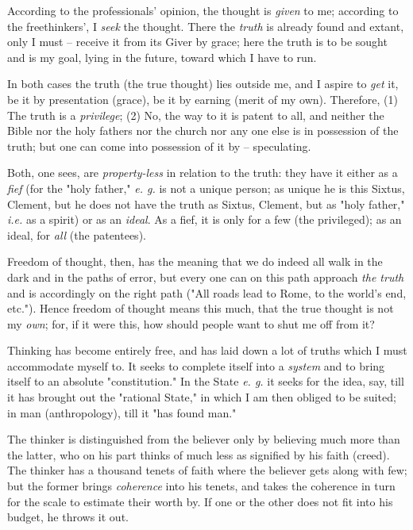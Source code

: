 \documentclass[a4paper]{book}
\begin{document}
According to the professionals' opinion, the thought is \textit{given} to me; 
according to the freethinkers', I \textit{seek} the thought. There the 
\textit{truth} is already found and extant, only I must -- receive it from its 
Giver by grace; here the truth is to be sought and is my goal, lying in the 
future, toward which I have to run.

In both cases the truth (the true thought) lies outside me, and I aspire to 
\textit{get} it, be it by presentation (grace), be it by earning (merit of my 
own). Therefore, (1) The truth is a \textit{privilege}; (2) No, the way to it 
is patent to all, and neither the Bible nor the holy fathers nor the church 
nor any one else is in possession of the truth; but one can come into 
possession of it by -- speculating.

Both, one sees, are \textit{property-less} in relation to the truth: they have 
it either as a \textit{fief} (for the "{}holy father,"{} \textit{e. g.} is not 
a unique person; as unique he is this Sixtus, Clement, but he does not have 
the truth as Sixtus, Clement, but as "{}holy father,"{} \textit{i.e.} as a 
spirit) or as an \textit{ideal}. As a fief, it is only for a few (the 
privileged); as an ideal, for \textit{all} (the patentees).

Freedom of thought, then, has the meaning that we do indeed all walk in the 
dark and in the paths of error, but every one can on this path approach 
\textit{the truth} and is accordingly on the right path ("{}All roads lead to 
Rome, to the world's end, etc."{}). Hence freedom of thought means this much, 
that the true thought is not my \textit{own}; for, if it were this, how should 
people want to shut me off from it?

Thinking has become entirely free, and has laid down a lot of truths which I 
must accommodate myself to. It seeks to complete itself into a \textit{system} 
and to bring itself to an absolute "{}constitution."{} In the State \textit{e. 
g.} it seeks for the idea, say, till it has brought out the "{}rational 
State,"{} in which I am then obliged to be suited; in man (anthropology), till 
it "{}has found man."{}

The thinker is distinguished from the believer only by believing much more 
than the latter, who on his part thinks of much less as signified by his faith 
(creed). The thinker has a thousand tenets of faith where the believer gets 
along with few; but the former brings \textit{coherence} into his tenets, and 
takes the coherence in turn for the scale to estimate their worth by. If one 
or the other does not fit into his budget, he throws it out.
\end{document}
